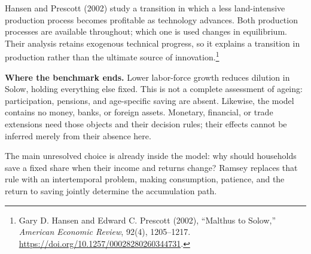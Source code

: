 Hansen and Prescott (2002) study a transition in which a less land-intensive
production process becomes profitable as technology advances. Both production
processes are available throughout; which one is used changes in equilibrium.
Their analysis retains exogenous technical progress, so it explains a transition
in production rather than the ultimate source of innovation.\footnote{Gary D.
Hansen and Edward C. Prescott (2002), ``Malthus to Solow,'' \textit{American
Economic Review}, 92(4), 1205--1217.
\url{https://doi.org/10.1257/00028280260344731}.}

\textbf{Where the benchmark ends.}
Lower labor-force growth reduces dilution in Solow, holding everything else
fixed. This is not a complete assessment of ageing: participation, pensions,
and age-specific saving are absent. Likewise, the model contains no money,
banks, or foreign assets. Monetary, financial, or trade extensions need those
objects and their decision rules; their effects cannot be inferred merely
from their absence here.

The main unresolved choice is already inside the model: why should households
save a fixed share when their income and returns change? Ramsey replaces that
rule with an intertemporal problem, making consumption, patience, and the return
to saving jointly determine the accumulation path.
